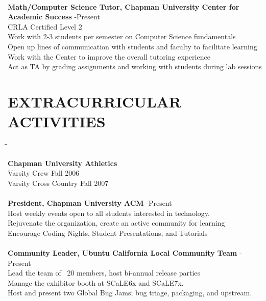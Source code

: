 \documentclass{res}
\begin{document}
\begin{resume}
\begin{tabbing}
\\

   {\bf Math/Computer Science Tutor, Chapman University Center for Academic Success} \> -Present\\
	 CRLA Certified Level 2\\
	 Work with 2-3 students per semester on Computer Science fundamentals\\
	 Open up lines of communication with students and faculty to facilitate learning\\
	 Work with the Center to improve the overall tutoring experience\\
	 Act as TA by grading assignments and working with students during lab sessions\\
	\end{tabbing}
 
\section{EXTRACURRICULAR ACTIVITIES}          
	\vspace{-5pt}
   \begin{tabbing}
   \hspace{2.5in}\= \hspace{3.45in}\= \kill %

    {\bf Chapman University Athletics}\\
	Varsity Crew \> \>\hspace{0.2in}Fall 2006\\
	Varsity Cross Country \> \>\hspace{0.2in}Fall 2007\\

\\

    {\bf President, Chapman University ACM} \> -Present\\
	 Host weekly events open to all students interested in technology.\\
	 Rejuvenate the organization, create an active community for learning \\
	 Encourage Coding Nights, Student Presentations, and Tutorials\\

\\

    {\bf Community Leader, Ubuntu California Local Community Team} \> -Present\\
	Lead the team of ~20 members, host bi-annual release parties \\
	Manage the exhibitor booth at SCaLE6x and SCaLE7x. \\
	Host and present two Global Bug Jams; bug triage, packaging, and upstream. \\


\end{tabbing}
\end{resume}
\end{document}
